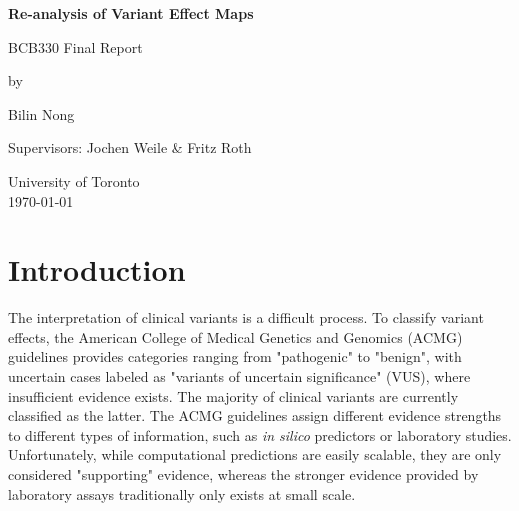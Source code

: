 \documentclass{article}
\begin{document}
\begin{titlepage}
   \begin{center}
       \vspace*{2cm}
       \Large

       \textbf{Re-analysis of Variant Effect Maps}

       \vspace{0.5cm}
        BCB330 Final Report
            
       \vspace{1.5cm}

       by \\
       \vspace{1.5cm }

       Bilin Nong

       \vspace{4cm}

        Supervisors: Jochen Weile \& Fritz Roth
    
           \vspace{6.5cm}  
     

       University of Toronto\\
       
       \today
        
       \vspace{0.8cm}
            
   \end{center}
\end{titlepage}

\large
\section{Introduction} %
The interpretation of clinical variants is a difficult process. To classify variant effects, the American College of Medical Genetics and Genomics (ACMG) guidelines\cite{richards_standards_2015} provides  categories ranging from "pathogenic" to "benign", with uncertain cases labeled as "variants of uncertain significance" (VUS), where insufficient evidence exists. The majority of clinical variants are currently classified as the latter\cite{weile_multiplexed_2018}. The ACMG guidelines assign different evidence strengths to different types of information, such as \textit{in silico} predictors or laboratory studies. Unfortunately, while computational predictions are easily scalable, they are only considered "supporting" evidence, whereas the stronger evidence provided by laboratory assays traditionally only exists at small scale.
\end{document}
